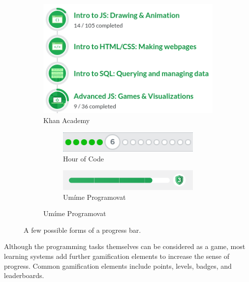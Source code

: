 
\begin{figure}[htb]
\centering
\begin{subfigure}{.48\textwidth}
\centering
\includegraphics[width=.9\textwidth]{img/ka-skills}
\caption{Khan Academy}
\end{subfigure}
\begin{subfigure}{.48\textwidth}
\centering
\begin{subfigure}{\textwidth}
\includegraphics[width=.9\textwidth]{img/hour-of-code-progress}
\caption{Hour of Code}
\end{subfigure}
\bigskip
\vspace{1mm}
\begin{subfigure}{\textwidth}
\includegraphics[width=.9\textwidth]{img/umime-progressbar-green}
\caption{Umíme Programovat} %
\end{subfigure}
\end{subfigure}
\caption{A few possible forms of a progress bar.}
\label{fig:progress-visualization}
\end{figure}



Although the programming tasks themselves can be considered as a game,
most learning systems add further gamification elements to increase the sense
of progress.
Common gamification elements include points, levels, badges, and leaderboards.

